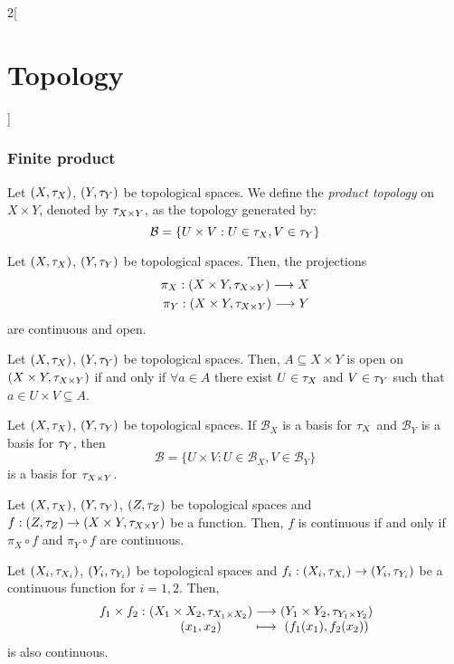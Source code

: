 \documentclass[../../../main.tex]{subfiles}
\begin{document}
\begin{multicols}{2}[\section{Topology}]
    \subsubsection{Finite product}
    \begin{definition}
        Let $(X,\tau_X)$, $(Y,\tau_Y)$ be topological spaces. We define the \emph{product topology} on $X\times Y$, denoted by $\tau_{X\times Y}$, as the topology generated by: $$\mathcal{B}=\{U\times V:U\in\tau_X,V\in\tau_Y\}$$
    \end{definition}
    \begin{prop}
        Let $(X,\tau_X)$, $(Y,\tau_Y)$ be topological spaces. Then, the projections
        \begin{align*}
            \pi_X:(X\times Y,\tau_{X\times Y})\longrightarrow X \\
            \pi_Y:(X\times Y,\tau_{X\times Y})\longrightarrow Y
        \end{align*}
        are continuous and open.
    \end{prop}
    \begin{prop}
        Let $(X,\tau_X)$, $(Y,\tau_Y)$ be topological spaces. Then, $A\subseteq X\times Y$ is open on $(X\times Y,\tau_{X\times Y})$ if and only if $\forall a\in A$ there exist $U\in\tau_X$ and $V\in\tau_Y$ such that $a\in U\times V\subseteq A$.
    \end{prop}
    \begin{prop}
        Let $(X,\tau_X)$, $(Y,\tau_Y)$ be topological spaces. If $\mathcal{B}_X$ is a basis for $\tau_X$ and $\mathcal{B}_Y$ is a basis for $\tau_Y$, then $$\mathcal{B}=\{U\times V:U\in\mathcal{B}_X,V\in\mathcal{B}_Y\}$$
        is a basis for $\tau_{X\times Y}$.
    \end{prop}
    \begin{prop}
        Let $(X,\tau_X)$, $(Y,\tau_Y)$, $(Z,\tau_Z)$ be topological spaces and $f:(Z,\tau_Z)\rightarrow(X\times Y,\tau_{X\times Y})$ be a function. Then, $f$ is continuous if and only if $\pi_X\circ f$ and $\pi_Y\circ f$ are continuous.
    \end{prop}
    \begin{prop}
        Let $(X_i,\tau_{X_i})$, $(Y_i,\tau_{Y_i})$ be topological spaces and $f_i:(X_i,\tau_{X_i})\rightarrow(Y_i,\tau_{Y_i})$ be a continuous function for $i=1,2$. Then,
        $$
            \function{f_1\times f_2}{(X_1\times X_2,\topo_{X_1\times X_2})}{(Y_1\times Y_2,\topo_{Y_1\times Y_2})}{(x_1,x_2)}{(f_1(x_1),f_2(x_2))}
        $$ is also continuous.

\end{prop}
\end{multicols}
\end{document}
